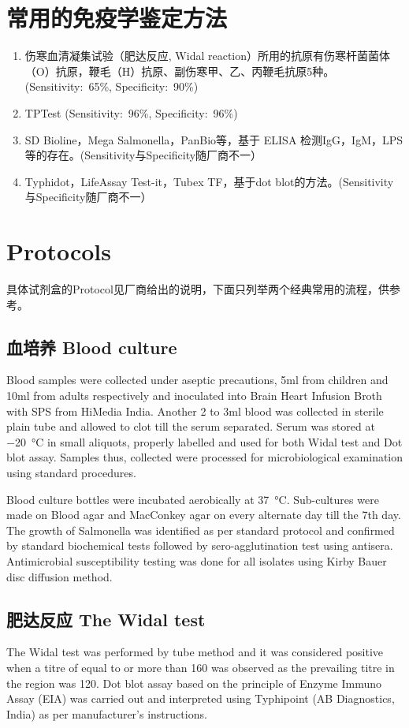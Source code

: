 \documentclass[cn,black,12pt,normal]{elegantnote}
\begin{document}
\section{常用的免疫学鉴定方法}

\begin{enumerate}
    \item 伤寒血清凝集试验（肥达反应, Widal reaction）所用的抗原有伤寒杆菌菌体（O）抗原，鞭毛（H）抗原、副伤寒甲、乙、丙鞭毛抗原5种。(Sensitivity:~65\%, Specificity:~90\%)
    \item TPTest (Sensitivity:~96\%, Specificity:~96\%)
    \item SD Bioline，Mega Salmonella，PanBio等，基于 ELISA 检测IgG，IgM，LPS等的存在。(Sensitivity与Specificity随厂商不一）
    \item Typhidot，LifeAssay Test-it，Tubex TF，基于dot blot的方法。(Sensitivity与Specificity随厂商不一）
\end{enumerate}

\section{Protocols}

具体试剂盒的Protocol见厂商给出的说明，下面只列举两个经典常用的流程，供参考。

\small
\subsection{血培养 Blood culture}

Blood samples were collected under aseptic precautions, 
5ml from children and 10ml from adults respectively and inoculated into Brain Heart Infusion Broth with SPS from HiMedia India.
Another 2 to 3ml blood was collected in sterile plain tube and allowed to clot till the serum separated. 
Serum was stored at \SI{-20}{\celsius} in small aliquots, properly labelled and used for both Widal test and Dot blot assay. 
Samples thus, collected were processed for microbiological examination using standard procedures.

Blood culture bottles were incubated aerobically at \SI{37}{\celsius}. 
Sub-cultures were made on Blood agar and MacConkey agar on every alternate day till the 7th day. 
The growth of Salmonella was identified as per standard protocol and confirmed by standard biochemical tests followed by 
sero-agglutination test using antisera. 
Antimicrobial susceptibility testing was done for all isolates using Kirby Bauer disc diffusion method.\cite{maheshwari2016comparative}

\subsection{肥达反应 The Widal test}

The Widal test was performed by tube method and it was considered positive when 
a titre of equal to or more than 160 was observed as the prevailing titre in the 
region was 120. Dot blot assay based on the principle of Enzyme Immuno Assay (EIA) was carried out and interpreted using Typhipoint (AB Diagnostics, India) as per manufacturer’s instructions.
\cite{maheshwari2016comparative}


{}
\end{document}
